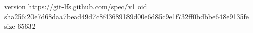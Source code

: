 version https://git-lfs.github.com/spec/v1
oid sha256:20e7d68daa7bead49d7c8f43689189d00e6d85c9e1f732ff0bdbbe648e9135fe
size 65632
